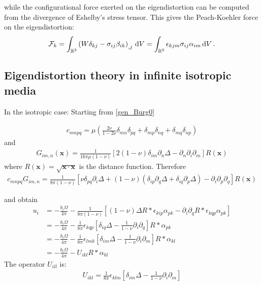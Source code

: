 while  the configurational force exerted on
the eigendistortion can be computed from the  divergence of  Eshelby's stress
tensor. This  gives the 
Peach-Koehler force on the eigendistortion:
\begin{align}
\mathcal{F}_k=\int_{\mathbb{R}^3}\left(W\delta_{kj}-\sigma_{ij}\beta_{ik}\right)_{,j}\,\text{d}V=\int_{\mathbb{R}^3}\epsilon_{kjm}\sigma_{ij}\alpha_{im}\,\text{d}V\,.
\label{EshelbyStress_classical}
\end{align}

\subsection{Eigendistortion theory in infinite isotropic media}
In the isotropic case:
Starting from \eqref{gen_Burg0}


\begin{align}
c_{mnpq}=\mu\left(\frac{2\nu}{1-2\nu}\delta_{mn}\delta_{pq}+\delta_{mp}\delta_{nq}+\delta_{mq}\delta_{np}\right)
\end{align}
and
\begin{align}
G_{im,n}(\bm x)=\frac{1}{16\pi \mu(1-\nu)}\left[2(1-\nu)\delta_{im}\partial_n\Delta-\partial_n\partial_i\partial_m\right]R(\bm x)
\end{align}
where $R(\bm x)=\sqrt{\bm x\cdot\bm x}$ is the distance function.
Therefore
\begin{align}
c_{mnpq}G_{im,n}=\frac{1}{8\pi(1-\nu)}\left[\nu\delta_{pq}\partial_i\Delta+(1-\nu)\left(\delta_{ip}\partial_q\Delta+\delta_{iq}\partial_p\Delta\right)-\partial_i\partial_p\partial_q\right]R(\bm x)
\end{align}

and obtain
\begin{align}
u_i&=-\frac{b_i\Omega}{4\pi}-\frac{1}{8\pi(1-\nu)}\left[(1-\nu)  \Delta R * \epsilon_{kip}\alpha_{pk} - \partial_i\partial_q R * \epsilon_{kqp}\alpha_{pk}\right]\nonumber\\
&=-\frac{b_i\Omega}{4\pi}-\frac{1}{8\pi}\epsilon_{kqp}\left[ \delta_{iq}\Delta  -\frac{1}{1-\nu} \partial_i\partial_q  \right] R * \alpha_{pk}\nonumber\\
&=-\frac{b_i\Omega}{4\pi}-\frac{1}{8\pi}\epsilon_{lmk}\left[ \delta_{im}\Delta  -\frac{1}{1-\nu} \partial_i\partial_m  \right] R * \alpha_{kl}\nonumber\\
&=-\frac{b_i\Omega}{4\pi}-U_{ikl} R * \alpha_{kl}
\end{align}
The operator $U_{ill}$ is:
\begin{align}
U_{ikl}=\frac{1}{8\pi}\epsilon_{klm}\left[ \delta_{im}\Delta  -\frac{1}{1-\nu} \partial_i\partial_m  \right]
\end{align}

